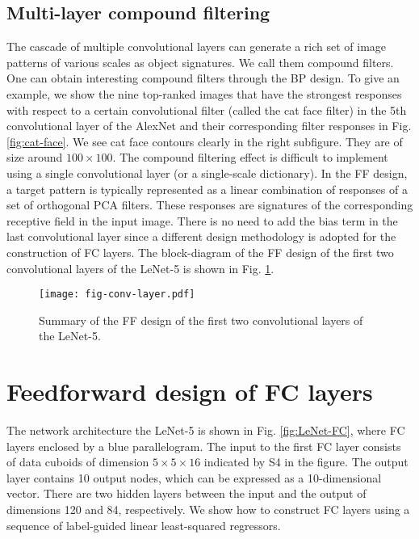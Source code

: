 \documentclass[preprint,12pt]{elsarticle}
\begin{document}
\subsection{Multi-layer compound filtering}\label{subsec:compound} 

The cascade of multiple convolutional layers can generate a rich set of
image patterns of various scales as object signatures. We call them
compound filters. One can obtain interesting compound filters through
the BP design. To give an example, we show the nine top-ranked images
that have the strongest responses with respect to a certain
convolutional filter (called the cat face filter) in the 5th
convolutional layer of the AlexNet \cite{NIPS2012_AlexNet} and their
corresponding filter responses in Fig. \ref{fig:cat-face}. We see cat
face contours clearly in the right subfigure.  They are of size around
$100 \times 100$. The compound filtering effect is difficult to
implement using a single convolutional layer (or a single-scale
dictionary).  In the FF design, a target pattern is typically
represented as a linear combination of responses of a set of orthogonal
PCA filters.  These responses are signatures of the corresponding
receptive field in the input image.  There is no need to add the bias
term in the last convolutional layer since a different design
methodology is adopted for the construction of FC layers.  The
block-diagram of the FF design of the first two convolutional layers of
the LeNet-5 is shown in Fig.  \ref{fig:ff-block-diagram}. 

\begin{figure}[htb]
\centering
\texttt{[image: fig-conv-layer.pdf]}
\caption{Summary of the FF design of the first two convolutional 
layers of the LeNet-5.}\label{fig:ff-block-diagram}
\end{figure}

\section{Feedforward design of FC layers}\label{sec:l3sr}

The network architecture the LeNet-5 is shown in Fig.
\ref{fig:LeNet-FC}, where FC layers enclosed by a blue parallelogram.
The input to the first FC layer consists of data cuboids of dimension
$5\times5\times 16$ indicated by S4 in the figure. The output layer
contains 10 output nodes, which can be expressed as a 10-dimensional
vector. There are two hidden layers between the input and the output of
dimensions 120 and 84, respectively.  We show how to construct FC layers
using a sequence of label-guided linear least-squared regressors. 
\end{document}
